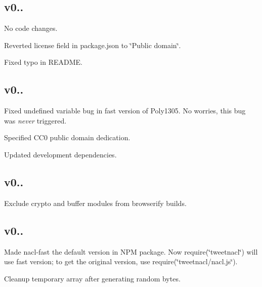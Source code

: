 \subsection*{v0.. }

No code changes.


\begin{DoxyItemize}
\item Reverted license field in package.\+json to \char`\"{}\+Public domain\char`\"{}.
\item Fixed typo in R\+E\+A\+D\+ME.
\end{DoxyItemize}

\subsection*{v0.. }


\begin{DoxyItemize}
\item Fixed undefined variable bug in fast version of Poly1305. No worries, this bug was {\itshape never} triggered.
\item Specified C\+C0 public domain dedication.
\item Updated development dependencies.
\end{DoxyItemize}

\subsection*{v0.. }


\begin{DoxyItemize}
\item Exclude {\ttfamily crypto} and {\ttfamily buffer} modules from browserify builds.
\end{DoxyItemize}

\subsection*{v0.. }


\begin{DoxyItemize}
\item Made {\ttfamily nacl-\/fast} the default version in N\+PM package. Now {\ttfamily require(\char`\"{}tweetnacl\char`\"{})} will use fast version; to get the original version, use {\ttfamily require(\char`\"{}tweetnacl/nacl.\+js\char`\"{})}.
\item Cleanup temporary array after generating random bytes.
\end{DoxyItemize}

